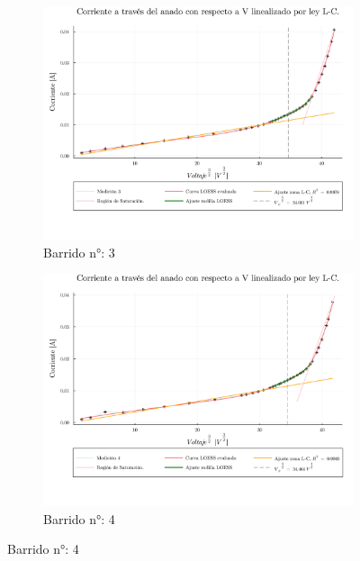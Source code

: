 \begin{figure}[H]
	\ContinuedFloat
	\centering
	\begin{subfigure}[b]{0.49\textwidth}
		\centering
		\includegraphics[width=\linewidth]{img/pot3.png}
		\caption{Barrido n°: 3}
		\label{fig:pot3}
	\end{subfigure}
	\hfill
	\begin{subfigure}[b]{0.49\textwidth}
		\centering
		\includegraphics[width=\linewidth]{img/pot4.png}
		\caption{Barrido n°: 4}
		\label{fig:pot4}
	\end{subfigure}
	
\end{figure}

